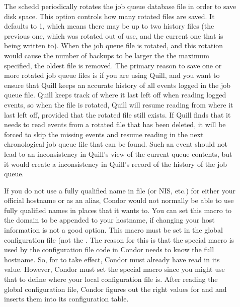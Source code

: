 \begin{description}
\item[]
\label{param:MaxJobQueueLogRotations}
  The schedd periodically rotates the job queue database file in order
  to save disk space.  This option controls how many rotated files are
  saved.  It defaults to 1, which means there may be up to two history
  files (the previous one, which was rotated out of use, and the current one
  that is being written to).  When the job queue file is rotated,
  and this rotation would cause the number of backups to be larger
  the the maximum specified, the oldest file is removed.  The primary
  reason to save one or more rotated job queue files is if you are
  using Quill, and you want to ensure that Quill keeps an accurate history
  of all events logged in the job queue file.  Quill keeps track of where
  it last left off when reading logged events, so when the file is rotated,
  Quill will resume reading from where it last left off, provided that
  the rotated file still exists.  If Quill finds that it needs to read
  events from a rotated file that has been deleted, it will be forced to
  skip the missing events and resume reading in the next chronological job
  queue file that can be found.  Such an event should not lead to
  an inconsistency in Quill's view of the current queue contents, but it
  would create a inconsistency in Quill's record of the history of the
  job queue.

\item[] \label{param:DefaultDomainName}
  If you do not use a fully qualified name in file 
  (or NIS, etc.) for either your official hostname or as an
  alias, Condor would not normally be able to use fully qualified names
  in places that it wants to.  You can set this macro to the
  domain to be appended to your hostname, if changing your host
  information is not a good option.  This macro must be set in the
  global configuration file (not the .
  The reason for this is that the special 
  macro is used by the configuration file code in Condor needs
  to know the full hostname.  So, for  to
  take effect, Condor must already have read in its value.  However,
  Condor must set the  special macro since you
  might use that to define where your local configuration file is.  After
  reading the global configuration file, Condor figures out the right values
  for  and  and inserts them
  into its configuration table.


\end{description}
